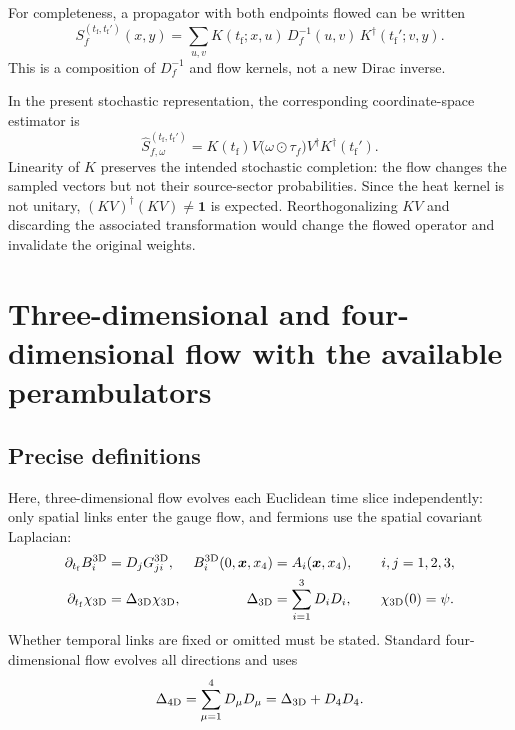 \documentclass[11pt]{article}
\numberwithin{equation}{section}
\newcommand{\tf}{t_{\mathrm f}}
\begin{document}
For completeness, a propagator with both endpoints flowed can be written
\begin{equation}
  S_f^{(\tf,\tf')}(x,y)
  =
  \sum_{u,v}
  K(\tf;x,u)\,
  D_f^{-1}(u,v)\,
  K^\dagger(\tf';v,y).
  \label{eq:flowed-propagator}
\end{equation}
This is a composition of \(D_f^{-1}\) and flow kernels, not a new Dirac
inverse.

In the present stochastic representation, the corresponding coordinate-space
estimator is
\begin{equation}
  \widehat S_{f,\omega}^{(\tf,\tf')}
  =K(\tf)V\bigl(\omega\odot\tau_f\bigr)V^\dagger K^\dagger(\tf').
  \label{eq:flowed-stochastic-propagator}
\end{equation}
Linearity of \(K\) preserves the intended stochastic completion: the flow
changes the sampled vectors but not their source-sector probabilities.  Since
the heat kernel is not unitary, \((KV)^\dagger(KV)\neq\mathbf 1\) is expected.
Reorthogonalizing \(KV\) and discarding the associated transformation would
change the flowed operator and invalidate the original weights.

\section{Three-dimensional and four-dimensional flow with the available
perambulators}
\label{sec:3d-vs-4d}

\subsection{Precise definitions}

Here, three-dimensional flow evolves each Euclidean time slice independently:
only spatial links enter the gauge flow, and fermions use the spatial
covariant Laplacian:
\begin{align}
  \partial_{\tf}B_i^{\rm 3D}
  &=
  D_jG_{ji}^{\rm 3D},
  &
  B_i^{\rm 3D}(0,\bm x,x_4)
  &=
  A_i(\bm x,x_4),
  \qquad i,j=1,2,3,
  \label{eq:3d-gauge-flow}
  \\
  \partial_{\tf}\chi_{\rm 3D}
  &=
  \Delta_{\rm 3D}\chi_{\rm 3D},
  &
  \Delta_{\rm 3D}
  &=
  \sum_{i=1}^{3}D_iD_i,
  \qquad
  \chi_{\rm 3D}(0)=\psi .
  \label{eq:3d-fermion-flow}
\end{align}
Whether temporal links are fixed or omitted must be stated. Standard
four-dimensional flow evolves all directions and uses
\begin{equation}
  \Delta_{\rm 4D}
  =
  \sum_{\mu=1}^{4}D_\mu D_\mu
  =
  \Delta_{\rm 3D}+D_4D_4.
  \label{eq:3d-4d-laplacians}
\end{equation}
\end{document}
